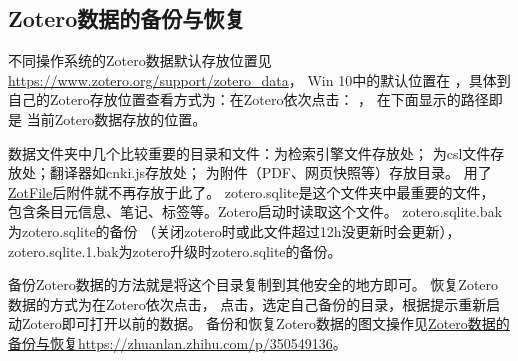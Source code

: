 \documentclass[cn,11pt,chinese]{elegantbook}
\begin{document}
			\subsection{Zotero数据的备份与恢复}
					不同操作系统的Zotero数据默认存放位置见\url{https://www.zotero.org/support/zotero_data}，
					Win 10中的默认位置在
					，具体到自己的Zotero存放位置查看方式为：在Zotero依次点击：
					，
					在下面显示的路径即是
					当前Zotero数据存放的位置。
					
					数据文件夹中几个比较重要的目录和文件：为检索引擎文件存放处；
					为csl文件存放处；翻译器如cnki.js存放处；
					为附件（PDF、网页快照等）存放目录。
					用了\href{http://zotfile.com/}{ZotFile}后附件就不再存放于此了。
					zotero.sqlite是这个文件夹中最重要的文件，
					包含条目元信息、笔记、标签等。Zotero启动时读取这个文件。
					zotero.sqlite.bak为zotero.sqlite的备份
					（关闭zotero时或此文件超过12h没更新时会更新），
					zotero.sqlite.1.bak为zotero升级时zotero.sqlite的备份。
		
					备份Zotero数据的方法就是将这个目录复制到其他安全的地方即可。
					恢复Zotero数据的方式为在Zotero依次点击，
					点击，选定自己备份的目录，根据提示重新启动Zotero即可打开以前的数据。
					备份和恢复Zotero数据的图文操作见\href{https://zhuanlan.zhihu.com/p/350549136}
					{Zotero数据的备份与恢复https://zhuanlan.zhihu.com/p/350549136}。
	
\end{document}
